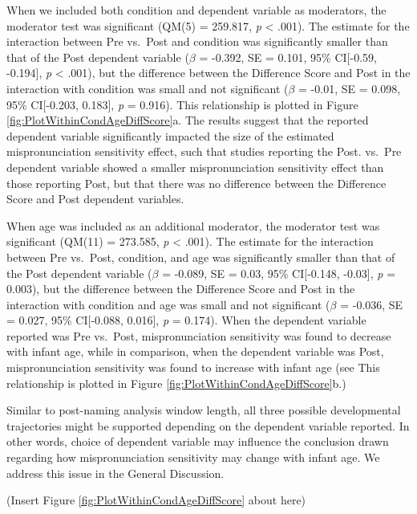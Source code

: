 \documentclass[man]{apa6}
\begin{document}
When we included both condition and dependent variable as moderators, the moderator test was significant (QM(5) = 259.817, \emph{p} \textless{} .001). The estimate for the interaction between Pre vs.~Post and condition was significantly smaller than that of the Post dependent variable (\(\beta\) = -0.392, SE = 0.101, 95\% CI{[}-0.59, -0.194{]}, \emph{p} \textless{} .001), but the difference between the Difference Score and Post in the interaction with condition was small and not significant (\(\beta\) = -0.01, SE = 0.098, 95\% CI{[}-0.203, 0.183{]}, \emph{p} = 0.916). This relationship is plotted in Figure \ref{fig:PlotWithinCondAgeDiffScore}a. The results suggest that the reported dependent variable significantly impacted the size of the estimated mispronunciation sensitivity effect, such that studies reporting the Post. vs.~Pre dependent variable showed a smaller mispronunciation sensitivity effect than those reporting Post, but that there was no difference between the Difference Score and Post dependent variables.

When age was included as an additional moderator, the moderator test was significant (QM(11) = 273.585, \emph{p} \textless{} .001). The estimate for the interaction between Pre vs.~Post, condition, and age was significantly smaller than that of the Post dependent variable (\(\beta\) = -0.089, SE = 0.03, 95\% CI{[}-0.148, -0.03{]}, \emph{p} = 0.003), but the difference between the Difference Score and Post in the interaction with condition and age was small and not significant (\(\beta\) = -0.036, SE = 0.027, 95\% CI{[}-0.088, 0.016{]}, \emph{p} = 0.174). When the dependent variable reported was Pre vs.~Post, mispronunciation sensitivity was found to decrease with infant age, while in comparison, when the dependent variable was Post, mispronunciation sensitivity was found to increase with infant age (see This relationship is plotted in Figure \ref{fig:PlotWithinCondAgeDiffScore}b.)

Similar to post-naming analysis window length, all three possible developmental trajectories might be supported depending on the dependent variable reported. In other words, choice of dependent variable may influence the conclusion drawn regarding how mispronunciation sensitivity may change with infant age. We address this issue in the General Discussion.

(Insert Figure \ref{fig:PlotWithinCondAgeDiffScore} about here)
\end{document}
